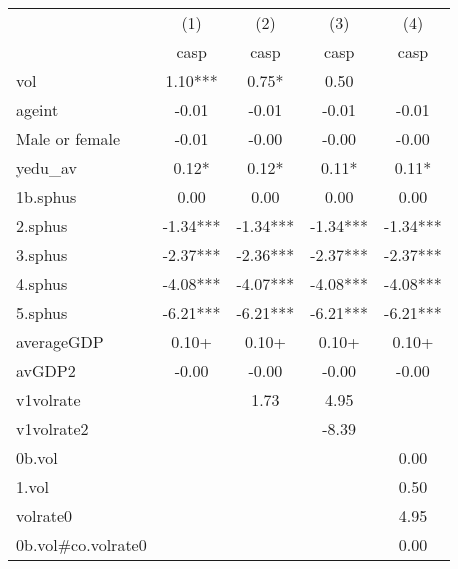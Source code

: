 {
\def\sym#1{\ifmmode^{#1}\else\(^{#1}\)\fi}
\begin{tabular}{l*{4}{c}}
\hline\hline
                    &\multicolumn{1}{c}{(1)}&\multicolumn{1}{c}{(2)}&\multicolumn{1}{c}{(3)}&\multicolumn{1}{c}{(4)}\\
                    &\multicolumn{1}{c}{casp}&\multicolumn{1}{c}{casp}&\multicolumn{1}{c}{casp}&\multicolumn{1}{c}{casp}\\
\hline
vol                 &        1.10***&        0.75*  &        0.50   &               \\
ageint              &       -0.01   &       -0.01   &       -0.01   &       -0.01   \\
Male or female      &       -0.01   &       -0.00   &       -0.00   &       -0.00   \\
yedu\_av             &        0.12*  &        0.12*  &        0.11*  &        0.11*  \\
1b.sphus            &        0.00   &        0.00   &        0.00   &        0.00   \\
2.sphus             &       -1.34***&       -1.34***&       -1.34***&       -1.34***\\
3.sphus             &       -2.37***&       -2.36***&       -2.37***&       -2.37***\\
4.sphus             &       -4.08***&       -4.07***&       -4.08***&       -4.08***\\
5.sphus             &       -6.21***&       -6.21***&       -6.21***&       -6.21***\\
averageGDP          &        0.10+  &        0.10+  &        0.10+  &        0.10+  \\
avGDP2              &       -0.00   &       -0.00   &       -0.00   &       -0.00   \\
v1volrate           &               &        1.73   &        4.95   &               \\
v1volrate2          &               &               &       -8.39   &               \\
0b.vol              &               &               &               &        0.00   \\
1.vol               &               &               &               &        0.50   \\
volrate0            &               &               &               &        4.95   \\
0b.vol#co.volrate0  &               &               &               &        0.00   \\

\end{tabular}}
